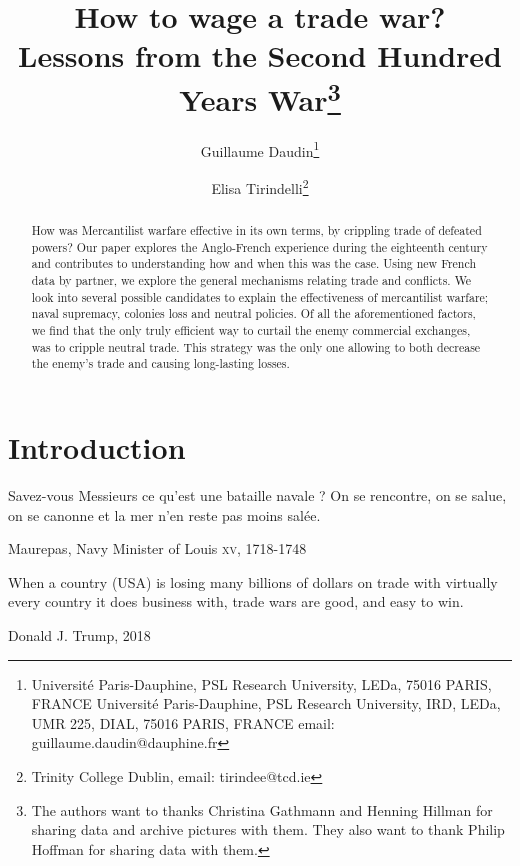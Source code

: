 \documentclass[12pt,a4paper,notitlepage,english]{article}
\author{
  Guillaume Daudin\thanks{Université Paris-Dauphine, PSL Research University, LEDa, 75016 PARIS, FRANCE Université Paris-Dauphine, PSL Research University, IRD, LEDa, UMR 225, DIAL, 75016 PARIS, FRANCE email: guillaume.daudin@dauphine.fr}
  \and
  Elisa Tirindelli\thanks{Trinity College Dublin, email: tirindee@tcd.ie}
}
\title{How to wage a trade war? \\ Lessons from the Second Hundred Years War\thanks{The authors want to thanks Christina Gathmann and Henning Hillman for sharing data and archive pictures with them. They also want to thank Philip Hoffman for sharing data with them.}}
\date{}
\begin{document}
\maketitle


\begin{abstract}
How was Mercantilist warfare effective in its own terms, by crippling trade of defeated powers? Our paper explores the Anglo-French experience during the eighteenth century and contributes to understanding how and when this was the case. Using new French data by partner, we explore the general mechanisms relating trade and conflicts. We look into several possible candidates to explain the effectiveness of mercantilist warfare; naval supremacy, colonies loss and neutral policies. Of all the aforementioned factors, we find that the only truly efficient way to curtail the enemy commercial exchanges, was to cripple neutral trade. This strategy was the only one allowing to both decrease the enemy's trade and causing long-lasting losses.
\end{abstract}


\section{Introduction} \label{introduction}

\epigraph{Savez-vous Messieurs ce qu’est une bataille navale ? On se rencontre, on se salue, on se canonne et la mer n’en reste pas moins salée.}{Maurepas, Navy Minister of Louis  \textsc{xv}, 1718-1748}

\epigraph{When a country (USA) is losing many billions of dollars on trade with virtually every country it does business with, trade wars are good, and easy to win.}{Donald J. Trump, 2018}




\maketitle
\end{document}
